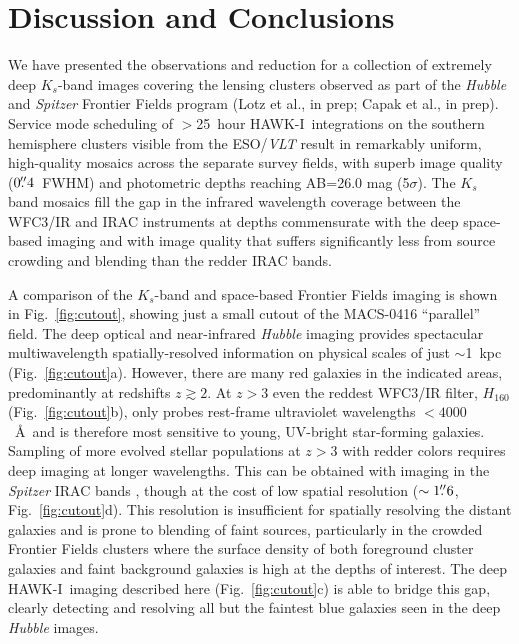 \documentclass[preprint2]{aastex6}
\gdef\HAWKI{\mbox{HAWK-I}}
\begin{document}
\section{Discussion and Conclusions}
\label{s:discussion}

 
We have presented the observations and reduction for a collection of extremely deep $K_s$-band images covering the lensing clusters observed as part of the \textit{Hubble} and \textit{Spitzer} Frontier Fields program (Lotz et al., in prep; Capak et al., in prep).  Service mode scheduling of $>$25~hour \HAWKI\ integrations on the southern hemisphere clusters visible from the ESO/\textit{VLT} result in remarkably uniform, high-quality mosaics across the separate survey fields, with superb image quality ($0\mbox{$.\!\!^{\prime\prime}$}4$~FWHM) and photometric depths reaching AB=26.0 mag (5$\sigma$).  The $K_s$ band mosaics fill the gap in the infrared wavelength coverage between the WFC3/IR and IRAC instruments at depths commensurate with the deep space-based imaging and with image quality that suffers significantly less from source crowding and blending than the redder IRAC bands.  

A comparison of the $K_s$-band and space-based Frontier Fields imaging is shown in Fig.~\ref{fig:cutout}, showing just a small cutout of the MACS-0416 ``parallel'' field.  The deep optical and near-infrared \textit{Hubble} imaging provides spectacular multiwavelength spatially-resolved information on physical scales of just $\sim$1~kpc (Fig.~\ref{fig:cutout}a).  However, there are many red galaxies in the indicated areas, predominantly at redshifts $z\gtrsim2$.  At $z>3$ even the reddest WFC3/IR filter, $H_{160}$ (Fig.~\ref{fig:cutout}b), only probes rest-frame ultraviolet wavelengths $<4000$~\AA\ and is therefore most sensitive to young, UV-bright star-forming galaxies.  Sampling of more evolved stellar populations at $z>3$ with redder colors requires deep imaging at longer wavelengths.  This can be obtained with imaging in the \textit{Spitzer} IRAC bands \citep[e.g.,][]{marchesini:10, stefanon:13}, though at the cost of low spatial resolution ($\sim1\mbox{$.\!\!^{\prime\prime}$}6$, Fig.~\ref{fig:cutout}d).  This resolution is insufficient for spatially resolving the distant galaxies and is prone to blending of faint sources, particularly in the crowded Frontier Fields clusters where the surface density of both foreground cluster galaxies and faint background galaxies is high at the depths of interest.  The deep \HAWKI\ imaging described here (Fig.~\ref{fig:cutout}c) is able to bridge this gap, clearly detecting and resolving all but the faintest blue galaxies seen in the deep \textit{Hubble} images.  
\end{document}
